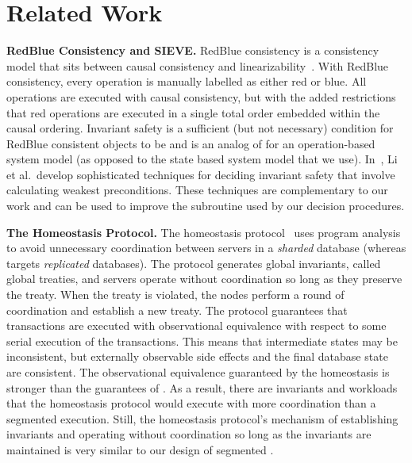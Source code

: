 \section{Related Work}

\newcommand{\sieve}{\textsc{SIEVE}}
\textbf{RedBlue Consistency and \sieve.}
RedBlue consistency is a consistency model that sits between causal consistency
and linearizability~\cite{li2012making}.
%
With RedBlue consistency, every operation is manually labelled as either red or
blue. All operations are executed with causal consistency, but with the added
restrictions that red operations are executed in a single total order embedded
within the causal ordering.
%
Invariant safety is a sufficient (but not necessary) condition for RedBlue
consistent objects to be \invariantconfluent{} and is an analog of
\invariantclosure{} for an operation-based system model (as opposed to the
state based system model that we use).  In~\cite{li2014automating}, Li et al.\
develop sophisticated techniques for deciding invariant safety that involve
calculating weakest preconditions. These techniques are complementary to our
work and can be used to improve the \invariantclosure{} subroutine used by our
decision procedures.

\textbf{The Homeostasis Protocol.}
The homeostasis protocol~\cite{roy2015homeostasis} uses program analysis to
avoid unnecessary coordination between servers in a \emph{sharded} database
(whereas \invariantconfluence{} targets \emph{replicated} databases). The
protocol generates global invariants, called global treaties, and servers
operate without coordination so long as they preserve the treaty. When the
treaty is violated, the nodes perform a round of coordination and establish a
new treaty. The protocol guarantees that transactions are executed with
observational equivalence with respect to some serial execution of the
transactions. This means that intermediate states may be inconsistent, but
externally observable side effects and the final database state are consistent.
The observational equivalence guaranteed by the homeostasis is stronger than
the guarantees of \invariantconfluence{}. As a result, there are invariants and
workloads that the homeostasis protocol would execute with more coordination
than a segmented \invariantconfluent{} execution. Still, the homeostasis
protocol's mechanism of establishing invariants and operating without
coordination so long as the invariants are maintained is very similar to our
design of segmented \invariantconfluence{}.

